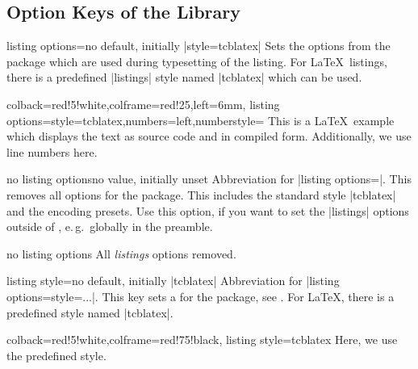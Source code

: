 \clearpage
\subsection{Option Keys of the  Library}\label{sec:speclistingkeys}

\begin{docTcbKey}{listing options}{=}{no default, initially |style=tcblatex|}
  Sets the options from the package  \cite{hoffmann:listings}
  which are used during typesetting of the listing.
  For \LaTeX\ listings, there is a predefined |listings| style named |tcblatex|
  which can be used.
\begin{dispExample}
\begin{tcblisting}{colback=red!5!white,colframe=red!25,left=6mm,
listing options={style=tcblatex,numbers=left,numberstyle=\tiny\color{red!75!black}}}
This is a \LaTeX\ example which displays the text as source code
and in compiled form. Additionally, we use line numbers here.
\end{tcblisting}
\end{dispExample}
\end{docTcbKey}


\begin{docTcbKey}{no listing options}{}{no value, initially unset}
  Abbreviation for |listing options={}|.
  This removes all options for the  package.
  This includes the  standard style |tcblatex| and the encoding presets.
  Use this option, if you want to set the |listings| options outside of , e.\,g.\ globally in
  the preamble.
\begin{dispExample}
\begin{tcblisting}{no listing options}
All \textit{listings} options removed.
\end{tcblisting}
\end{dispExample}
\end{docTcbKey}


\begin{docTcbKey}{listing style}{=}{no default, initially |tcblatex|}
  Abbreviation for |listing options={style=...}|. This key sets a 
  for the  package, see \cite{hoffmann:listings}.
  For \LaTeX, there is a predefined style named |tcblatex|.
\begin{dispExample}
\begin{tcblisting}{colback=red!5!white,colframe=red!75!black,
listing style=tcblatex}
Here, we use the predefined style.
\end{tcblisting}
\end{dispExample}
\end{docTcbKey}

